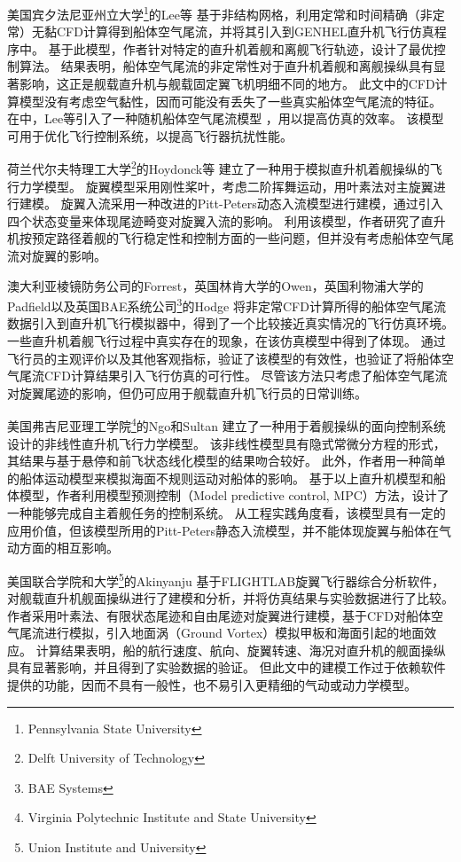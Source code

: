 美国宾夕法尼亚州立大学\footnote{Pennsylvania State University}的Lee等
基于非结构网格，利用定常和时间精确（非定常）无黏CFD计算得到船体空气尾流，并将其引入到GENHEL直升机飞行仿真程序中。
基于此模型，作者针对特定的直升机着舰和离舰飞行轨迹，设计了最优控制算法。
结果表明，船体空气尾流的非定常性对于直升机着舰和离舰操纵具有显著影响，这正是舰载直升机与舰载固定翼飞机明细不同的地方。
此文中的CFD计算模型没有考虑空气黏性，因而可能没有丢失了一些真实船体空气尾流的特征。
在\cite{Lee2004}中，Lee等引入了一种随机船体空气尾流模型 ，用以提高仿真的效率。
该模型可用于优化飞行控制系统，以提高飞行器抗扰性能。

荷兰代尔夫特理工大学\footnote{Delft University of Technology}的Hoydonck等
建立了一种用于模拟直升机着舰操纵的飞行力学模型。
旋翼模型采用刚性桨叶，考虑二阶挥舞运动，用叶素法对主旋翼进行建模。
旋翼入流采用一种改进的Pitt-Peters动态入流模型进行建模，通过引入四个状态变量来体现尾迹畸变对旋翼入流的影响。
利用该模型，作者研究了直升机按预定路径着舰的飞行稳定性和控制方面的一些问题，但并没有考虑船体空气尾流对旋翼的影响。

澳大利亚棱镜防务公司的Forrest，英国林肯大学的Owen，英国利物浦大学的Padfield以及英国BAE系统公司\footnote{BAE Systems}的Hodge
将非定常CFD计算所得的船体空气尾流数据引入到直升机飞行模拟器中，得到了一个比较接近真实情况的飞行仿真环境。
一些直升机着舰飞行过程中真实存在的现象，在该仿真模型中得到了体现。
通过飞行员的主观评价以及其他客观指标，验证了该模型的有效性，也验证了将船体空气尾流CFD计算结果引入飞行仿真的可行性。
尽管该方法只考虑了船体空气尾流对旋翼尾迹的影响，但仍可应用于舰载直升机飞行员的日常训练。

美国弗吉尼亚理工学院\footnote{Virginia Polytechnic Institute and State University}的Ngo和Sultan
建立了一种用于着舰操纵的面向控制系统设计的非线性直升机飞行力学模型。
该非线性模型具有隐式常微分方程的形式，其结果与基于悬停和前飞状态线化模型的结果吻合较好。
此外，作者用一种简单的船体运动模型来模拟海面不规则运动对船体的影响。
基于以上直升机模型和船体模型，作者利用模型预测控制（Model predictive control, MPC）方法，设计了一种能够完成自主着舰任务的控制系统。
从工程实践角度看，该模型具有一定的应用价值，但该模型所用的Pitt-Peters静态入流模型，并不能体现旋翼与船体在气动方面的相互影响。

美国联合学院和大学\footnote{Union Institute and University}的Akinyanju
基于FLIGHTLAB旋翼飞行器综合分析软件，对舰载直升机舰面操纵进行了建模和分析，并将仿真结果与实验数据进行了比较。
作者采用叶素法、有限状态尾迹和自由尾迹对旋翼进行建模，基于CFD对船体空气尾流进行模拟，引入地面涡（Ground Vortex）模拟甲板和海面引起的地面效应。
计算结果表明，船的航行速度、航向、旋翼转速、海况对直升机的舰面操纵具有显著影响，并且得到了实验数据的验证。
但此文中的建模工作过于依赖软件提供的功能，因而不具有一般性，也不易引入更精细的气动或动力学模型。

